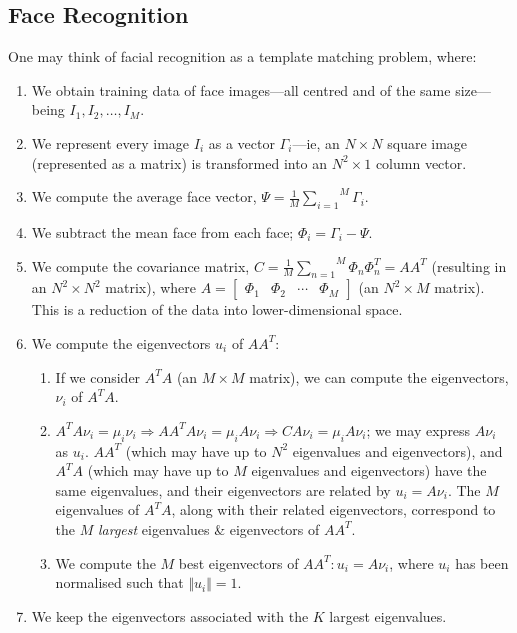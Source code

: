 
\subsection{Face Recognition}\label{sub_sec:face_recognition}

One may think of facial recognition as a template matching problem, where:

\begin{enumerate}
    \item We obtain training data of face images---all centred and of the same size---being $I_{1}, I_{2}, \ldots, I_{M}$.
    \item We represent every image $I_{i}$ as a vector $\varGamma_{i}$---ie, an $N \times N$ square image (represented as a matrix) is transformed into an $N^{2} \times 1$ column vector.
    \item We compute the average face vector, $\varPsi = \frac{1}{M} \overset{M}{\underset{i=1}{\sum}} \varGamma_{i}$.
    \item We subtract the mean face from each face; $\varPhi_{i} = \varGamma_{i} - \varPsi$.
    \item We compute the covariance matrix, $C = \frac{1}{M} \overset{M}{\underset{n=1}{\sum}} \varPhi_{n} \varPhi_{n}^{T} = A A^{T}$ (resulting in an $N^{2} \times N^{2}$ matrix), where $A = \begin{bmatrix} \varPhi_{1} & \varPhi_{2} & \cdots & \varPhi_{M} \end{bmatrix}$ (an $N^{2} \times M$ matrix). This is a reduction of the data into lower-dimensional space.
    \item We compute the eigenvectors $u_{i}$ of $A A^{T}$:
    \begin{enumerate}
        \item If we consider $A^{T} A$ (an $M \times M$ matrix), we can compute the eigenvectors, $\nu_{i}$ of $A^{T} A$.
        \item $A^{T} A \nu_{i} = \mu_{i} \nu_{i} \Rightarrow A A^{T} A \nu_{i} = \mu_{i} A \nu_{i} \Rightarrow C A \nu_{i} = \mu_{i} A \nu_{i}$; we may express $A \nu_{i}$ as $u_{i}$. $A A^{T}$ (which may have up to $N^{2}$ eigenvalues and eigenvectors), and $A^{T} A$ (which may have up to $M$ eigenvalues and eigenvectors) have the same eigenvalues, and their eigenvectors are related by $u_{i} = A \nu_{i}$. The $M$ eigenvalues of $A^{T} A$, along with their related eigenvectors, correspond to the $M$ \emph{largest} eigenvalues \& eigenvectors of $A A^{T}$.
        \item We compute the $M$ best eigenvectors of $A A^{T}: u_{i} = A \nu_{i}$, where $u_{i}$ has been normalised such that $\Vert u_{i} \Vert = 1$.
    \end{enumerate}
    \item We keep the eigenvectors associated with the $K$ largest eigenvalues.
\end{enumerate}

